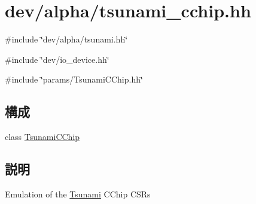 \hypertarget{tsunami__cchip_8hh}{
\section{dev/alpha/tsunami\_\-cchip.hh}
\label{tsunami__cchip_8hh}
}
{\ttfamily \#include \char`\"{}dev/alpha/tsunami.hh\char`\"{}}\par
{\ttfamily \#include \char`\"{}dev/io\_\-device.hh\char`\"{}}\par
{\ttfamily \#include \char`\"{}params/TsunamiCChip.hh\char`\"{}}\par
\subsection*{構成}
\begin{DoxyCompactItemize}
\item 
class \hyperlink{classTsunamiCChip}{TsunamiCChip}
\end{DoxyCompactItemize}


\subsection{説明}
Emulation of the \hyperlink{classTsunami}{Tsunami} CChip CSRs 